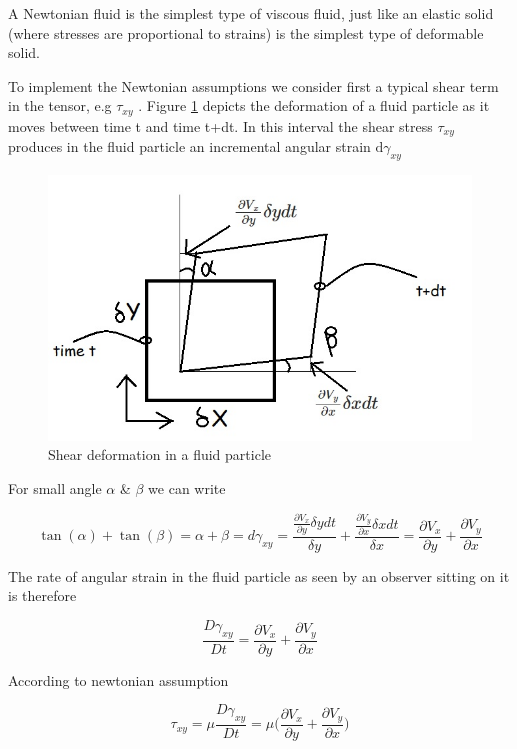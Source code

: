\documentclass{article}
\begin{document}
{A Newtonian fluid is the simplest type of viscous fluid, just like an elastic solid (where stresses are proportional to strains) is the simplest type of deformable solid.

To implement the Newtonian assumptions we consider first a typical shear term in the tensor, e.g $\tau_{xy}$ . Figure \ref{fig:shr_defrmtn_fl_prtcl}  depicts the deformation of a fluid particle as it moves between time t and time t+dt. In this interval the shear stress $\tau_{xy}$ produces in the fluid particle an incremental angular strain $\text{d}\gamma_{xy}$

\begin{figure}[h!]
\centering
\includegraphics[scale=.5]{shear deformation in a fluid particle.jpg}
\caption{Shear deformation in a fluid particle}
\label{fig:shr_defrmtn_fl_prtcl}
\end{figure}

For small angle $\alpha$ \& $\beta$ we can write 

$$\tan(\alpha) + \tan(\beta) = \alpha + \beta = d\gamma_{xy} = \frac{\frac{\partial V_{x}}{\partial y}\delta y dt}{\delta y} + \frac{\frac{\partial V_{y}}{\partial x}\delta x dt}{\delta x} =  \frac{\partial V_{x}}{\partial y} + \frac{\partial V_{y}}{\partial x}$$

The rate of angular strain in the fluid particle as seen by an observer sitting on it is therefore

$$\frac{D\gamma_{xy}}{Dt} = \frac{\partial V_{x}}{\partial y} + \frac{\partial V_{y}}{\partial x}$$

According to newtonian assumption 

\begin{equation} \label{16a}
\tau_{xy} = \mu \frac{D\gamma_{xy}}{Dt} = \mu \bigg(\frac{\partial V_{x}}{\partial y} + \frac{\partial V_{y}}{\partial x}\bigg) \tag{16a}
\end{equation}

}
\end{document}

